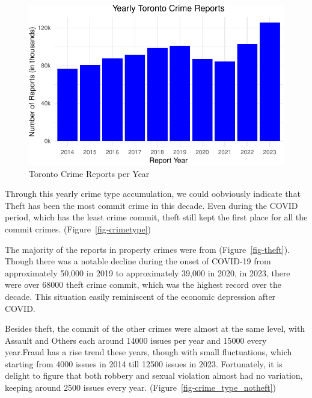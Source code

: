 \documentclass[
  letterpaper,
  DIV=11,
  numbers=noendperiod]{scrartcl}
\begin{document}
\begin{figure}

{\centering \includegraphics{paper_files/figure-pdf/fig-yearlycrimereport-1.pdf}

}

\caption{\label{fig-yearlycrimereport}Toronto Crime Reports per Year}

\end{figure}

Through this yearly crime type accumulation, we could oobviously
indicate that Theft has been the most commit crime in this decade. Even
during the COVID period, which has the least crime commit, theft still
kept the first place for all the commit crimes.
(Figure~\ref{fig-crimetype})

The majority of the reports in property crimes were from
(Figure~\ref{fig-theft}). Though there was a notable decline during the
onset of COVID-19 from approximately 50,000 in 2019 to approximately
39,000 in 2020, in 2023, there were over 68000 theft crime commit, which
was the highest record over the decade. This situation easily
reminiscent of the economic depression after COVID.

Besides theft, the commit of the other crimes were almost at the same
level, with Assault and Others each around 14000 issues per year and
15000 every year.Fraud has a rise trend these years, though with small
fluctuations, which starting from 4000 issues in 2014 till 12500 issues
in 2023. Fortunately, it is delight to figure that both robbery and
sexual violation almost had no variation, keeping around 2500 issues
every year. (Figure~\ref{fig-crime_type_notheft})
\end{document}
